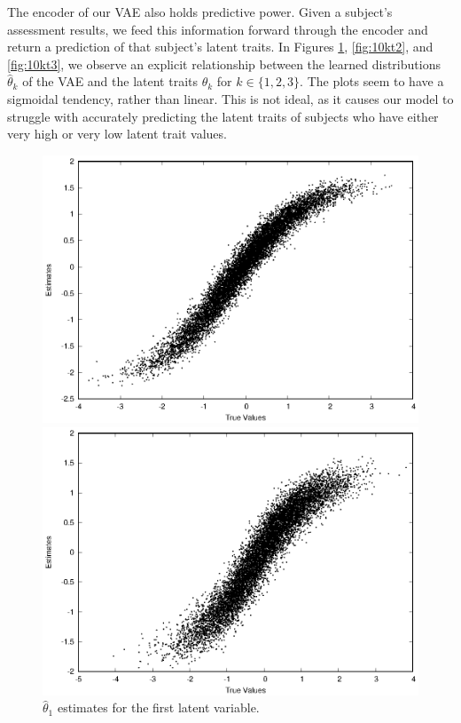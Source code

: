 The encoder of our VAE also holds predictive power. Given a subject's assessment results, we feed this information forward through the encoder and return a prediction of that subject's latent traits. In Figures \ref{fig:10kt1}, \ref{fig:10kt2}, and \ref{fig:10kt3}, we observe an explicit relationship between the learned distributions $\hat{\theta}_k$ of the VAE and the latent traits $\theta_k$ for $k\in\{1,2,3\}$. The plots seem to have a sigmoidal tendency, rather than linear. This is not ideal, as it causes our model to struggle with accurately predicting the latent traits of subjects who have either very high or very low latent trait values. 
\begin{figure}[h!]
\includegraphics[width=\textwidth]{img/ijcnn_results/10k_t1_scaled.eps}
\caption{$\hat{\theta}_1$ estimates for the first latent variable.}
\label{fig:10kt1}
\endminipage\hfill
{}
\includegraphics[width=\textwidth]{img/ijcnn_results/10k_t2_scaled.eps}

\end{figure}
